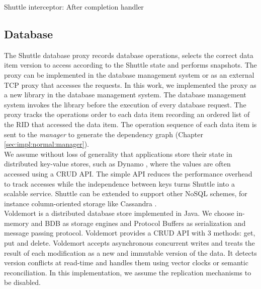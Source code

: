 \begin{algorithm}
\DontPrintSemicolon{}

	\BlankLine
	 \caption{Shuttle interceptor: After completion handler}
	\label{code:interceptor_code_pos}
\end{algorithm}



\subsection{Database}\label{sec:impl:normal:database}
The Shuttle database proxy records database operations, selects the correct data item version to access according to the Shuttle state and performs snapshots. The proxy can be implemented in the database management system or as an external \ac{TCP} proxy that accesses the requests. In this work, we implemented the proxy as a new library in the database management system. The database management system invokes the library before the execution of every database request. The proxy tracks the operations order to each data item recording an ordered list of the \ac{RID} that accessed the data item. The operation sequence of each data item is sent to the \textit{manager} to generate the dependency graph (Chapter \ref{sec:impl:normal:manager}). \\


We assume without loss of generality that applications store their state in distributed key-value stores, such as Dynamo \cite{Decandia2007}, where the values are often accessed using a \ac{CRUD} API. The simple \ac{API} reduces the performance overhead to track accesses while the independence between keys turns Shuttle into a scalable service. Shuttle can be extended to support other \acs{NoSQL} schemes, for instance column-oriented storage like Cassandra \cite{Lakshman2010a}.\\

Voldemort is a distributed database store implemented in Java. We choose in-memory and \ac{BDB} as storage engines and Protocol Buffers as serialization and message passing protocol. Voldemort provides a \ac{CRUD} \ac{API} with 3 methods: get, put and delete. Voldemort accepts asynchronous concurrent writes and treats the result of each modification as a new and immutable version of the data. It detects version conflicts at read-time and handles them using vector clocks or semantic reconciliation. In this implementation, we assume the replication mechanisms to be disabled. 


